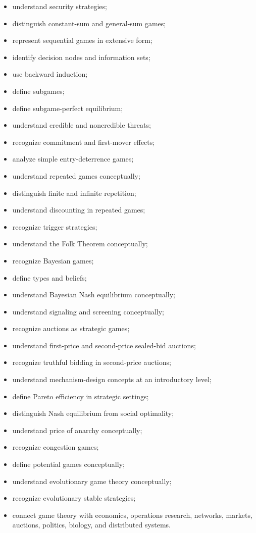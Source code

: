 {\begin{itemize}
    \item understand security strategies;
    \item distinguish constant-sum and general-sum games;
    \item represent sequential games in extensive form;
    \item identify decision nodes and information sets;
    \item use backward induction;
    \item define subgames;
    \item define subgame-perfect equilibrium;
    \item understand credible and noncredible threats;
    \item recognize commitment and first-mover effects;
    \item analyze simple entry-deterrence games;
    \item understand repeated games conceptually;
    \item distinguish finite and infinite repetition;
    \item understand discounting in repeated games;
    \item recognize trigger strategies;
    \item understand the Folk Theorem conceptually;
    \item recognize Bayesian games;
    \item define types and beliefs;
    \item understand Bayesian Nash equilibrium conceptually;
    \item understand signaling and screening conceptually;
    \item recognize auctions as strategic games;
    \item understand first-price and second-price sealed-bid auctions;
    \item recognize truthful bidding in second-price auctions;
    \item understand mechanism-design concepts at an introductory level;
    \item define Pareto efficiency in strategic settings;
    \item distinguish Nash equilibrium from social optimality;
    \item understand price of anarchy conceptually;
    \item recognize congestion games;
    \item define potential games conceptually;
    \item understand evolutionary game theory conceptually;
    \item recognize evolutionary stable strategies;
    \item connect game theory with economics, operations research,
          networks, markets, auctions, politics, biology, and distributed
          systems.
\end{itemize}
}

